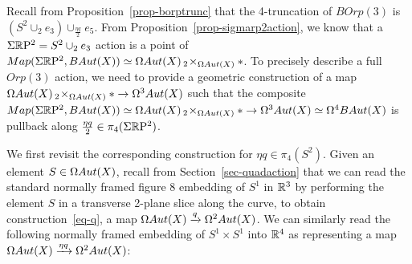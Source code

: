 \documentclass{amsart}
\begin{document}
Recall from Proposition~\ref{prop-borptrunc} that the 4-truncation of $BOrp(3)$ is $(S^2 \cup_2 e_3) \cup_{\frac{\eta q}{2}} e_5$.  From Proposition~\ref{prop-sigmarp2action}, we know that a $\Sigma \mathbb R \mathrm{P}^2 = S^2 \cup_2 e_3$ action is a point of $Map(\Sigma \mathbb R \mathrm{P}^2,BAut(X)) \simeq \Omega Aut(X) \,_2\! \times_{\Omega Aut(X)} \ast$.  To precisely describe a full $Orp(3)$ action, we need to provide a geometric construction of a map $\Omega Aut(X) \,_2\! \times_{\Omega Aut(X)} \ast \rightarrow \Omega^3 Aut(X)$ such that the composite $Map(\Sigma \mathbb R \mathrm{P}^2,BAut(X)) \simeq \Omega Aut(X) \,_2\! \times_{\Omega Aut(X)} \ast \rightarrow \Omega^3 Aut(X) \simeq \Omega^4 BAut(X)$ is pullback along $\frac{\eta q}{2} \in \pi_4(\Sigma\mathbb R \mathrm{P}^2)$.  

We first revisit the corresponding construction for $\eta q \in \pi_4(S^2)$.  Given an element $S \in \Omega Aut(X)$, recall from Section~\ref{sec-quadaction} that we can read the standard normally framed figure 8 embedding of $S^1$ in $\mathbb R^3$ by performing the element $S$ in a transverse 2-plane slice along the curve, to obtain construction~\eqref{eq-q}, a map $\Omega Aut(X) \xrightarrow{q} \Omega^2 Aut(X)$.  We can similarly read the following normally framed embedding of $S^1 \times S^1$ into $\mathbb R^4$ as representing a map $\Omega Aut(X) \xrightarrow{\eta q} \Omega^2 Aut(X)$:
\end{document}

